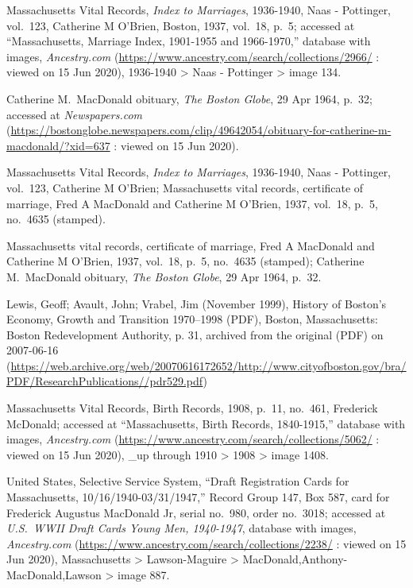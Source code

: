 \begin{thebibliography}{999}
Massachusetts Vital Records, \textit{Index to Marriages}, 1936-1940, Naas - Pottinger, vol.\ 123, Catherine M O'Brien, Boston, 1937, vol.\ 18, p.\ 5; accessed at ``Massachusetts, Marriage Index, 1901-1955 and 1966-1970,'' database with images, \textit{Ancestry.com} (\url{https://www.ancestry.com/search/collections/2966/} : viewed on 15 Jun 2020), 1936-1940 > Naas - Pottinger > image 134.

Catherine M.\ MacDonald obituary, \textit{The Boston Globe}, 29 Apr 1964, p.\ 32; accessed at \textit{Newspapers.com} (\url{https://bostonglobe.newspapers.com/clip/49642054/obituary-for-catherine-m-macdonald/?xid=637} : viewed on 15 Jun 2020).

Massachusetts Vital Records, \textit{Index to Marriages}, 1936-1940, Naas - Pottinger, vol.\ 123, Catherine M O'Brien; Massachusetts vital records, certificate of marriage, Fred A MacDonald and Catherine M O'Brien, 1937, vol.\ 18, p.\ 5, no.\ 4635 (stamped).

Massachusetts vital records, certificate of marriage, Fred A MacDonald and Catherine M O'Brien, 1937, vol.\ 18, p.\ 5, no.\ 4635 (stamped); Catherine M.\ MacDonald obituary, \textit{The Boston Globe}, 29 Apr 1964, p.\ 32.

Lewis, Geoff; Avault, John; Vrabel, Jim (November 1999), History of Boston's Economy, Growth and Transition 1970–1998 (PDF), Boston, Massachusetts: Boston Redevelopment Authority, p. 31, archived from the original (PDF) on 2007-06-16 (\url{https://web.archive.org/web/20070616172652/http://www.cityofboston.gov/bra/PDF/ResearchPublications//pdr529.pdf})

Massachusetts Vital Records, Birth Records, 1908, p.\ 11, no.\ 461, Frederick McDonald; accessed at ``Massachusetts, Birth Records, 1840-1915,'' database with images, \textit{Ancestry.com} (\url{https://www.ancestry.com/search/collections/5062/} : viewed on 15 Jun 2020), \_up through 1910 > 1908 > image 1408.

United States, Selective Service System, ``Draft Registration Cards for Massachusetts, 10/16/1940-03/31/1947,'' Record Group 147, Box 587, card for Frederick Augustus MacDonald Jr, serial no.\ 980, order no.\ 3018; accessed at \textit{U.S.\ WWII Draft Cards Young Men, 1940-1947}, database with images, \textit{Ancestry.com} (\url{https://www.ancestry.com/search/collections/2238/} : viewed on 15 Jun 2020), Massachusetts > Lawson-Maguire > MacDonald,Anthony-MacDonald,Lawson > image 887.


\end{thebibliography}
